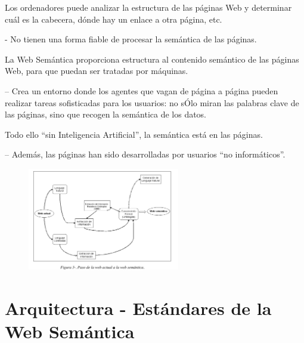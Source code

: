 Los ordenadores puede analizar la estructura de las páginas Web y determinar cuál es la cabecera, dónde hay un enlace a otra página, etc.

- No tienen una forma fiable de procesar la semántica de las páginas.

La Web Semántica proporciona estructura al contenido semántico de las páginas Web, para que puedan ser tratadas por máquinas.

– Crea un entorno donde los agentes que vagan de página a página pueden realizar tareas sofisticadas para los usuarios: no sÓlo miran las palabras clave de las páginas, sino que recogen la semántica de los datos.

Todo ello “sin Inteligencia Artificial”, la semántica está en las páginas. 

– Además, las páginas han sido desarrolladas por usuarios “no informáticos”.







\begin{figure}[H]
	\centering
	\includegraphics[height=4.5cm]{imagenes/capitulo3/25} 
	\caption{}
	\label{}
\end{figure}

\section{Arquitectura - Estándares de la Web Semántica}


